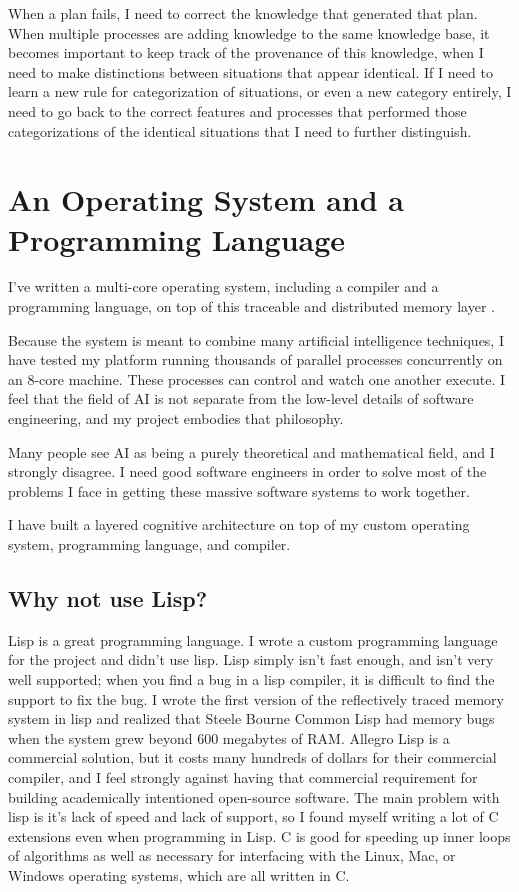 When a plan fails, I need to correct the knowledge that generated that
plan.  When multiple processes are adding knowledge to the same
knowledge base, it becomes important to keep track of the provenance of
this knowledge, when I need to make distinctions between situations
that appear identical.  If I need to learn a new rule for
categorization of situations, or even a new category entirely, I need
to go back to the correct features and processes that performed those
categorizations of the identical situations that I need to further
distinguish.

\section{An Operating System and a Programming Language}

I've written a multi-core operating system, including a compiler and a
programming language, on top of this traceable and distributed memory
layer \citep{morgan:2009}.

Because the system is meant to combine many artificial intelligence
techniques, I have tested my platform running thousands of parallel
processes concurrently on an 8-core machine.  These processes can
control and watch one another execute.  I feel that the field of AI
is not separate from the low-level details of software engineering,
and my project embodies that philosophy.

Many people see AI as being a purely theoretical and mathematical
field, and I strongly disagree.  I need good software engineers in
order to solve most of the problems I face in getting these massive
software systems to work together.

I have built a layered cognitive architecture on top of my custom
operating system, programming language, and compiler.

\subsection{Why not use Lisp?}

Lisp is a great programming language.  I wrote a custom programming
language for the project and didn't use lisp.  Lisp simply isn't fast
enough, and isn't very well supported; when you find a bug in a lisp
compiler, it is difficult to find the support to fix the bug.  I wrote
the first version of the reflectively traced memory system in lisp and
realized that Steele Bourne Common Lisp had memory bugs when the
system grew beyond 600 megabytes of RAM.  Allegro Lisp is a commercial
solution, but it costs many hundreds of dollars for their commercial
compiler, and I feel strongly against having that commercial
requirement for building academically intentioned open-source
software.  The main problem with lisp is it's lack of speed and lack
of support, so I found myself writing a lot of C extensions even when
programming in Lisp.  C is good for speeding up inner loops of
algorithms as well as necessary for interfacing with the Linux, Mac,
or Windows operating systems, which are all written in C.

